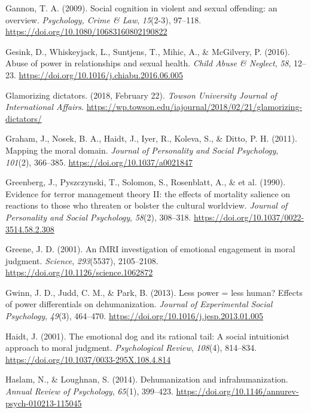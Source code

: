 \documentclass[
  donotrepeattitle,doc, 12pt, a4paper,floatsintext]{apa7}
\newlength{\cslhangindent}
\newlength{\cslentryspacingunit} %
\newenvironment{CSLReferences}[2] %
 {%
  \setlength{\parindent}{0pt}
  \ifodd #1
  \let\oldpar\par
  \def\par{\hangindent=\cslhangindent\oldpar}
  \fi
  \setlength{\parskip}{#2\cslentryspacingunit}
 }%
 {}
\begin{document}
\begin{CSLReferences}{1}{0}
\leavevmode{}%
Gannon, T. A. (2009). Social cognition in violent and sexual offending: an overview. \emph{Psychology, Crime \& Law}, \emph{15}(2-3), 97--118. \url{https://doi.org/10.1080/10683160802190822}

\leavevmode{}%
Gesink, D., Whiskeyjack, L., Suntjens, T., Mihic, A., \& McGilvery, P. (2016). Abuse of power in relationships and sexual health. \emph{Child Abuse \& Neglect}, \emph{58}, 12--23. \url{https://doi.org/10.1016/j.chiabu.2016.06.005}

\leavevmode{}%
Glamorizing dictators. (2018, February 22). \emph{Towson University Journal of International Affairs}. \url{https://wp.towson.edu/iajournal/2018/02/21/glamorizing-dictators/}

\leavevmode{}%
Graham, J., Nosek, B. A., Haidt, J., Iyer, R., Koleva, S., \& Ditto, P. H. (2011). Mapping the moral domain. \emph{Journal of Personality and Social Psychology}, \emph{101}(2), 366--385. \url{https://doi.org/10.1037/a0021847}

\leavevmode{}%
Greenberg, J., Pyszczynski, T., Solomon, S., Rosenblatt, A., \& et al. (1990). Evidence for terror management theory II: the effects of mortality salience on reactions to those who threaten or bolster the cultural worldview. \emph{Journal of Personality and Social Psychology}, \emph{58}(2), 308--318. \url{https://doi.org/10.1037/0022-3514.58.2.308}

\leavevmode{}%
Greene, J. D. (2001). An fMRI investigation of emotional engagement in moral judgment. \emph{Science}, \emph{293}(5537), 2105--2108. \url{https://doi.org/10.1126/science.1062872}

\leavevmode{}%
Gwinn, J. D., Judd, C. M., \& Park, B. (2013). Less power = less human? Effects of power differentials on dehumanization. \emph{Journal of Experimental Social Psychology}, \emph{49}(3), 464--470. \url{https://doi.org/10.1016/j.jesp.2013.01.005}

\leavevmode{}%
Haidt, J. (2001). The emotional dog and its rational tail: A social intuitionist approach to moral judgment. \emph{Psychological Review}, \emph{108}(4), 814--834. \url{https://doi.org/10.1037/0033-295X.108.4.814}

\leavevmode{}%
Haslam, N., \& Loughnan, S. (2014). Dehumanization and infrahumanization. \emph{Annual Review of Psychology}, \emph{65}(1), 399--423. \url{https://doi.org/10.1146/annurev-psych-010213-115045}


\end{CSLReferences}
\end{document}
